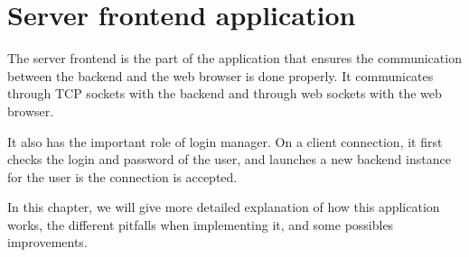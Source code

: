 \chapter{Server frontend application}
%
The server frontend is the part of the application that ensures 
the communication between the backend and the web browser is done 
properly. It communicates through TCP sockets with the backend
and through web sockets with the web browser.

It also has the important role of login manager. On a client connection, 
it first checks the login and password of the user, and launches a new 
backend instance for the user is the connection is accepted.

In this chapter, we will give more detailed explanation of how this 
application works, the different pitfalls when implementing it, and 
some possibles improvements.
%

